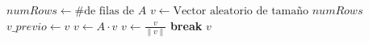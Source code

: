     \State $numRows \gets \text{\# de filas de } A$
    \State $v \gets \text{Vector aleatorio de tamaño } numRows$ %
        \State $v\_previo \gets v$
        \State $v \gets A \cdot v$
        \State $v \gets \frac{v}{\|v\|}$ %
            \State \textbf{break}
        \EndIf
    \EndFor
    \State \Return $v$
\EndFunction